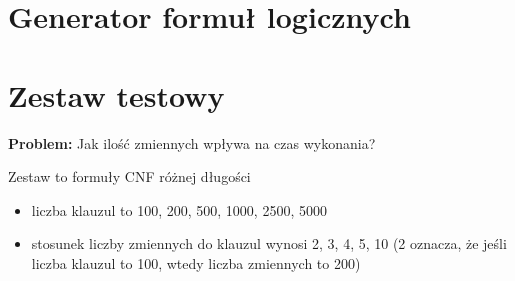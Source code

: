 \documentclass[a4paper,12pt]{article}
\begin{document}
%
%
%
%


\section{Generator formuł logicznych} \label{LFG}


%

\newpage
\section{Zestaw testowy}

\noindent
\textbf{Problem:} Jak ilość zmiennych wpływa na czas wykonania?

Zestaw to formuły CNF różnej długości
\begin{itemize}
  \item liczba klauzul to 100, 200, 500, 1000, 2500, 5000
  \item stosunek liczby zmiennych do klauzul wynosi 2, 3, 4, 5, 10 (2 oznacza, że jeśli liczba klauzul to 100, wtedy liczba zmiennych to 200)
\end{itemize}
\end{document}

